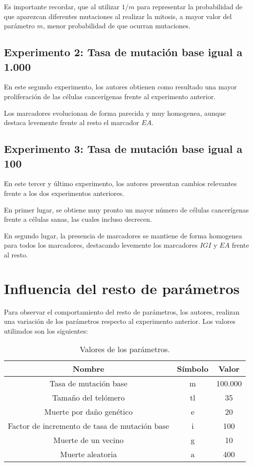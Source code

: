 Es importante recordar, que al utilizar $1/m$ para representar la probabilidad
de que aparezcan diferentes mutaciones al realizar la mitosis, a mayor valor
del parámetro $m$, menor probabilidad de que ocurran mutaciones.

\subsection{Experimento 2: Tasa de mutación base igual a 1.000}

En este segundo experimento, los autores obtienen como resultado una mayor proliferación
de las células cancerígenas frente al experimento anterior.

Los marcadores evolucionan de forma parecida y muy homogenea, aunque destaca levemente
frente al resto el marcador $EA$.

\subsection{Experimento 3: Tasa de mutación base igual a 100}

En este tercer y último experimento, los autores presentan cambios relevantes frente a los dos
experimentos anteriores.

En primer lugar, se obtiene muy pronto un mayor número de células cancerígenas
frente a células sanas, las cuales incluso decrecen.

En segundo lugar, la presencia de marcadores se mantiene de forma homogenea para todos
los marcadores, destacando levemente los marcadores $IGI$ y $EA$ frente al resto.

\section{Influencia del resto de parámetros}

Para observar el comportamiento del resto de parámetros, los autores, realizan una variación
de los parámetros respecto al experimento anterior. Los valores utilizados son los siguientes:

\begin{table}[h!]
  \centering
  \caption{Valores de los parámetros.}
  \label{tab:table1}
  \begin{tabular}{ccc}
    \toprule
    Nombre & Símbolo & Valor\\
    \midrule
    Tasa de mutación base & m & 100.000\\
    Tamaño del telómero & tl & 35\\
    Muerte por daño genético & e & 20\\
    Factor de incremento de tasa de mutación base & i & 100\\
    Muerte de un vecino & g & 10\\
    Muerte aleatoria & a & 400\\
    \bottomrule
  \end{tabular}
\end{table}

